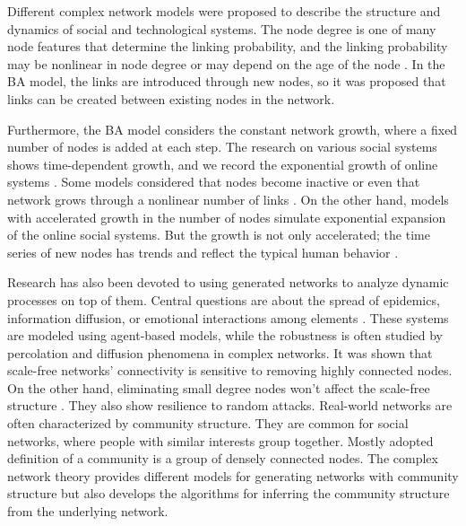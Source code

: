 Different complex network models were proposed to describe the structure and dynamics of social and technological systems. The node degree is one of many node features that determine the linking probability, and the linking probability may be nonlinear in node degree or may depend on the age of the node \cite{dorogovtsev2000b, dorogovtsev2001b}. In the BA model, the links are introduced through new nodes, so it was proposed that links can be created between existing nodes in the network.  

Furthermore, the BA model considers the constant network growth, where a fixed number of nodes is added at each step. The research on various social systems shows time-dependent growth, and we record the exponential growth of online systems \cite{liu2019}. Some models considered that nodes become inactive or even that network grows through a nonlinear number of links \cite{pham2016}. On the other hand, models with accelerated growth in the number of nodes \cite{sen2004} simulate exponential expansion of the online social systems. But the growth is not only accelerated; the time series of new nodes has trends and reflect the typical human behavior \cite{mitrovic2010a, mitrovic2012,mitrovic2015}.

Research has also been devoted to using generated networks to analyze dynamic processes on top of them. Central questions are about the spread of epidemics, information diffusion, or emotional interactions among elements \cite{garas2012emotional}. These systems are modeled using agent-based models, while the robustness is often studied by percolation and diffusion phenomena in complex networks. It was shown that scale-free networks' connectivity is sensitive to removing highly connected nodes. On the other hand, eliminating small degree nodes won't affect the scale-free structure \cite{cohen2000resilience}. They also show resilience to random attacks. Real-world networks are often characterized by community structure. They are common for social networks, where people with similar interests group together. Mostly adopted definition of a community is a group of densely connected nodes. The complex network theory provides different models for generating networks with community structure but also develops the algorithms for inferring the community structure from the underlying network. 
 

